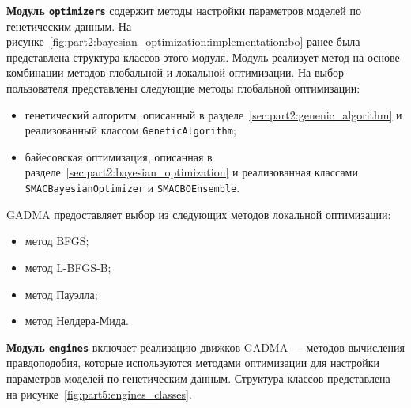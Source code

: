 
\textbf{Модуль \texttt{optimizers}} содержит методы настройки параметров моделей по генетическим данным.
На рисунке~\ref{fig:part2:bayesian_optimization:implementation:bo} ранее была представлена структура классов этого модуля.
Модуль реализует метод на основе комбинации методов глобальной и локальной оптимизации.
На выбор пользователя представлены следующие методы глобальной оптимизации:
\begin{itemize}
    \item генетический алгоритм, описанный в разделе~\ref{sec:part2:genenic_algorithm} и реализованный классом \texttt{GeneticAlgorithm};
    \item байесовская оптимизация, описанная в разделе~\ref{sec:part2:bayesian_optimization} и реализованная классами \texttt{SMACBayesianOptimizer} и \texttt{SMACBOEnsemble}.
\end{itemize}
GADMA предоставляет выбор из следующих методов локальной оптимизации:
\begin{itemize}
    \item метод BFGS;
    \item метод L-BFGS-B;
    \item метод Пауэлла;
    \item метод Нелдера-Мида.
\end{itemize}




\textbf{Модуль \texttt{engines}} включает реализацию движков GADMA --- методов вычисления правдоподобия, которые используются методами оптимизации для настройки параметров моделей по генетическим данным.
Структура классов представлена на рисунке~\ref{fig:part5:engines_classes}.

